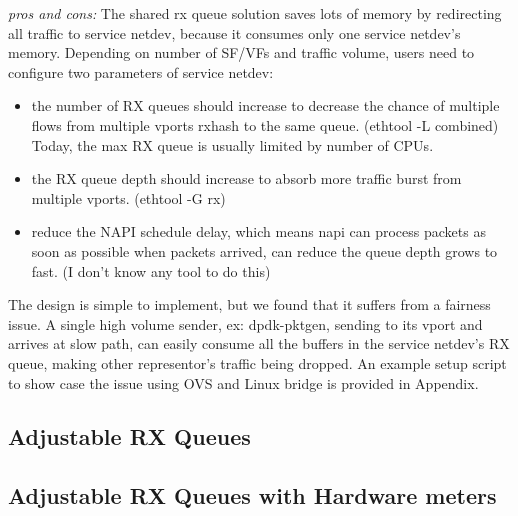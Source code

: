 \documentclass[letterpaper]{article}
\begin{document}
\emph{pros and cons:}
The shared rx queue solution saves lots of memory by redirecting
all traffic to service netdev, because it consumes only one service
netdev's memory. Depending on number of SF/VFs and traffic volume,
users need to configure two parameters of service netdev:
\begin{itemize}
    \item the number of RX queues should increase to decrease the chance
    of multiple flows from multiple vports rxhash to the same queue.
    (ethtool -L combined) Today, the max RX queue is usually limited by
    number of CPUs.
    \item the RX queue depth should increase to absorb more traffic
    burst from multiple vports. (ethtool -G rx)
    \item reduce the NAPI schedule delay, which means napi can process
    packets as soon as possible when packets arrived, can reduce the queue
    depth grows to fast. (I don't know any tool to do this)
\end{itemize}

The design is simple to implement, but we found that it suffers from
a fairness issue. A single high volume sender, ex: dpdk-pktgen,
sending to its vport and arrives at slow path, can easily consume all
the buffers in the service netdev's RX queue, making other representor's
traffic being dropped. An example setup script to show case the issue
using OVS and Linux bridge is provided in Appendix.

\newpage
\subsection{Adjustable RX Queues}



\subsection{Adjustable RX Queues with Hardware meters}

\end{document}
